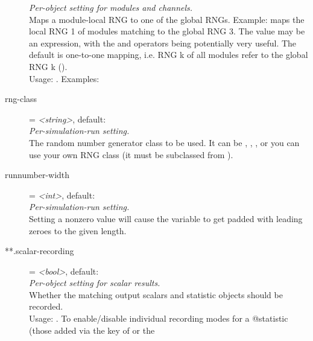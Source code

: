 \begin{description}
    \textit{Per-object setting for modules and channels.}\\
    Maps a module-local RNG to one of the global RNGs. Example:
    maps the local RNG 1 of modules matching  to the
    global RNG 3. The value may be an expression, with the  and
     operators being potentially very useful. The
    default is one-to-one mapping, i.e. RNG k of all modules refer to the
    global RNG k ().\\
    Usage:
    .
    Examples:
\item[rng-class] = \textit{<string>}, default: \\
    \textit{Per-simulation-run setting.}\\
    The random number generator class to be used. It can be
    , , , or you can use
    your own RNG class (it must be subclassed from ).
\item[runnumber-width] = \textit{<int>}, default: \\
    \textit{Per-simulation-run setting.}\\
    Setting a nonzero value will cause the  variable to get
    padded with leading zeroes to the given length.
\item[**.scalar-recording] = \textit{<bool>}, default: \\
    \textit{Per-object setting for scalar results.}\\
    Whether the matching output scalars and statistic objects should be
    recorded.\\
    Usage:
    .
    To enable/disable individual recording modes for a @statistic (those added
    via the  key of
     or the

\end{description}
